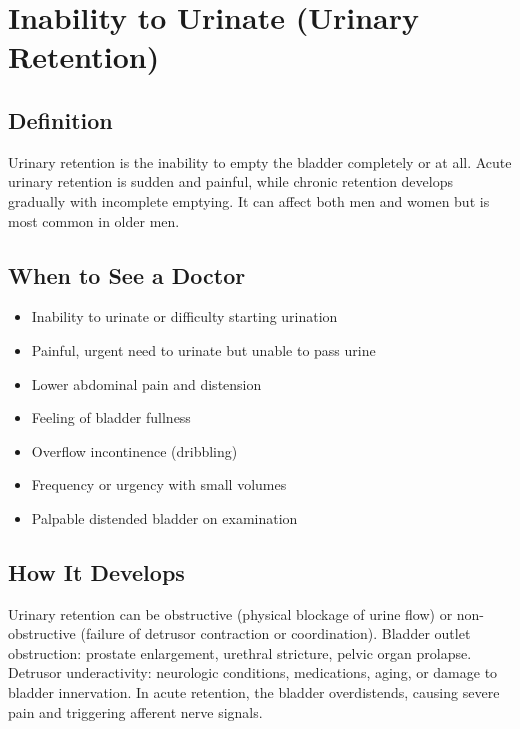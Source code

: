 \chapter{Inability to Urinate (Urinary Retention)}

\section*{Definition}
Urinary retention is the inability to empty the bladder completely or at all. Acute urinary retention is sudden and painful, while chronic retention develops gradually with incomplete emptying. It can affect both men and women but is most common in older men.

\section*{When to See a Doctor}
\begin{itemize}
\item Inability to urinate or difficulty starting urination
\item Painful, urgent need to urinate but unable to pass urine
\item Lower abdominal pain and distension
\item Feeling of bladder fullness
\item Overflow incontinence (dribbling)
\item Frequency or urgency with small volumes
\item Palpable distended bladder on examination
\end{itemize}

\section*{How It Develops}
Urinary retention can be obstructive (physical blockage of urine flow) or non-obstructive (failure of detrusor contraction or coordination). Bladder outlet obstruction: prostate enlargement, urethral stricture, pelvic organ prolapse. Detrusor underactivity: neurologic conditions, medications, aging, or damage to bladder innervation. In acute retention, the bladder overdistends, causing severe pain and triggering afferent nerve signals.

